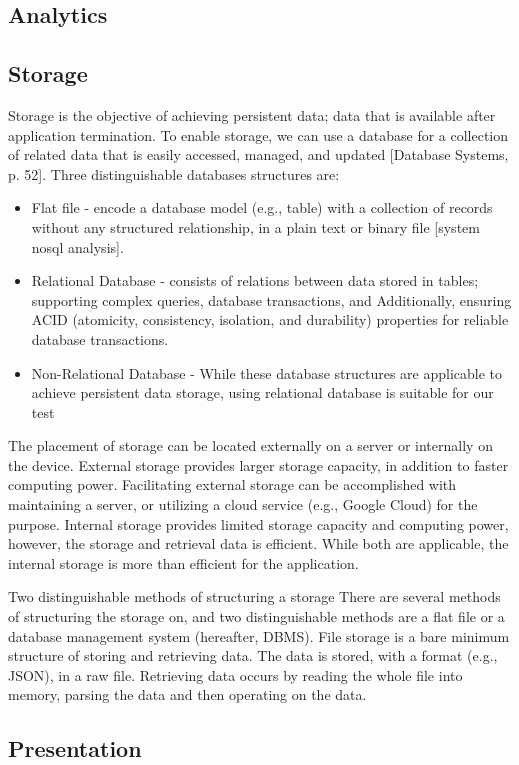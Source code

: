\subsection{Analytics}

\subsection{Storage}

\noindent Storage is the objective of achieving persistent data; data that is available after application termination.  To enable storage, we can use a database for a collection of related data that is easily accessed, managed, and updated [Database Systems, p. 52]. Three distinguishable databases structures are:
\begin{itemize}
    \item Flat file - encode a database model (e.g., table) with a collection of records without any structured relationship, in a plain text or binary file [system nosql analysis]. 
    \item Relational Database - consists of relations between data stored in tables; supporting complex queries, database transactions, and   Additionally, ensuring ACID (atomicity, consistency, isolation, and durability) properties for reliable database transactions. 
    \item Non-Relational Database - While these database structures are applicable to achieve persistent data storage, using relational database is suitable for our test
\end{itemize}

The placement of storage can be located externally on a server or internally on the device. External storage provides larger storage capacity, in addition to faster computing power. Facilitating external storage can be accomplished with maintaining a server, or utilizing a cloud service (e.g., Google Cloud) for the purpose. Internal storage provides limited storage capacity and computing power, however, the storage and retrieval data is efficient.  While both are applicable, the internal storage is more than efficient for the application.

Two distinguishable methods of structuring a storage 
There are several methods of structuring the storage on, and two distinguishable methods are a flat file or a database management system (hereafter, DBMS). File storage is a bare minimum structure of storing and retrieving data. The data is stored, with a format (e.g., JSON), in a raw file. Retrieving data occurs by reading the whole file into memory, parsing the data and then operating on the data.


\subsection{Presentation}
